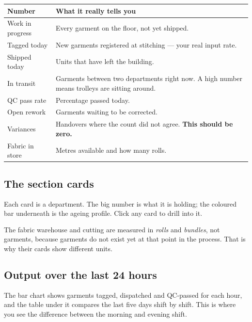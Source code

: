 \begin{table}[H]
\centering
\small
\begin{tabular}{@{}p{34mm}p{104mm}@{}}
\toprule
\textbf{Number} & \textbf{What it really tells you} \\
\midrule
Work in progress   & Every garment on the floor, not yet shipped. \\
Tagged today       & New garments registered at stitching --- your real input rate. \\
Shipped today      & Units that have left the building. \\
In transit         & Garments between two departments right now. A high number means trolleys are sitting around. \\
QC pass rate       & Percentage passed today. \\
Open rework        & Garments waiting to be corrected. \\
Variances          & Handovers where the count did not agree. \textbf{This should be zero.} \\
Fabric in store    & Metres available and how many rolls. \\
\bottomrule
\end{tabular}
\end{table}

\subsection{The section cards}

Each card is a department. The big number is what it is holding; the coloured bar
underneath is the ageing profile. Click any card to drill into it.

\begin{plainwords}
The fabric warehouse and cutting are measured in \emph{rolls} and \emph{bundles},
not garments, because garments do not exist yet at that point in the process.
That is why their cards show different units.
\end{plainwords}

\subsection{Output over the last 24 hours}

The bar chart shows garments tagged, dispatched and QC-passed for each hour, and
the table under it compares the last five days shift by shift. This is where you
see the difference between the morning and evening shift.

